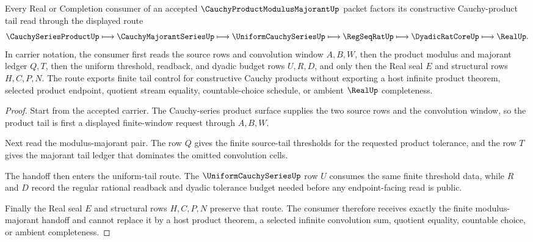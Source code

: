 \begin{theorem}
\label{thm:cauchy-product-modulus-majorant-uniform-tail-route}
Every Real or Completion consumer of an accepted $\CauchyProductModulusMajorantUp$ packet factors its constructive Cauchy-product tail read through the displayed route
$$
\CauchySeriesProductUp \longmapsto \CauchyMajorantSeriesUp \longmapsto \UniformCauchySeriesUp \longmapsto \RegSeqRatUp \longmapsto \DyadicRatCoreUp \longmapsto \RealUp .
$$
In carrier notation, the consumer first reads the source rows and convolution window $A,B,W$, then the product modulus and majorant ledger $Q,T$, then the uniform threshold, readback, and dyadic budget rows $U,R,D$, and only then the Real seal $E$ and structural rows $H,C,P,N$. The route exports finite tail control for constructive Cauchy products without exporting a host infinite product theorem, selected product endpoint, quotient stream equality, countable-choice schedule, or ambient $\RealUp$ completeness.
\end{theorem}
\begin{proof}
Start from the accepted carrier. The Cauchy-series product surface supplies the two source rows and the convolution window, so the product tail is first a displayed finite-window request through $A,B,W$.

Next read the modulus-majorant pair. The row $Q$ gives the finite source-tail thresholds for the requested product tolerance, and the row $T$ gives the majorant tail ledger that dominates the omitted convolution cells.

The handoff then enters the uniform-tail route. The $\UniformCauchySeriesUp$ row $U$ consumes the same finite threshold data, while $R$ and $D$ record the regular rational readback and dyadic tolerance budget needed before any endpoint-facing read is public.

Finally the Real seal $E$ and structural rows $H,C,P,N$ preserve that route. The consumer therefore receives exactly the finite modulus-majorant handoff and cannot replace it by a host product theorem, a selected infinite convolution sum, quotient equality, countable choice, or ambient completeness.
\end{proof}


